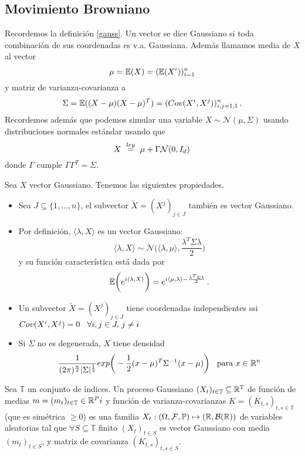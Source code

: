 % 

\subsection{Movimiento Browniano}
Recordemos la definición \ref{gauss}. Un vector se dice Gaussiano si toda combinación de sus coordenadas es v.a. Gaussiana. Además llamamos media de $X$ al vector
$$ \mu = \mathbb{E}(X) = (\mathbb{E}(X^i))^n_{i=1}$$
y matriz de varianza-covarianza a 
$$ \Sigma = \mathbb{E}((X-\mu)(X-\mu)^T)=(Cov(X^i,X^j))^n_{i,j=1,1} \,.$$
Recordemos además que podemos simular una variable $X\sim\mathcal{N}(\mu,\Sigma)$ usando distribuciones normales estándar usando que
$$ X\mbox{ }\overset{ley}{=}\mbox{ } \mu + \Gamma \mathcal{N}(0,I_d) \, $$
donde $\Gamma$ cumple $\Gamma \Gamma^T=\Sigma$. %

\begin{proposition}
Sea $X$ vector Gaussiano. Tenemos las siguientes propiedades.
\begin{itemize}
    \item Sea $J\subseteq \{1,\dots,n\}$, el subvector $\tilde X = (X^j)_{j\in J}$ también es vector Gaussiano.
    \item Por definición, $\langle \lambda,X\rangle $ es un vector Gaussiano:
    $$ \langle \lambda,X\rangle \sim \mathcal{N}\bigg(\langle \lambda,\mu\rangle,\frac{\lambda^T\Sigma\lambda}{2}\bigg) $$
    y su función característica está dada por
    $$ \mathbb{E}\bigg(e^{i\langle \lambda,X\rangle}\bigg) = \displaystyle e^{i\langle \mu,\lambda\rangle-\frac{\lambda^T\Sigma\lambda}{2}} \,.$$
    \item Un subvector $\tilde X=(X^j)_{j\in J}$ tiene coordenadas independientes ssi $Cov(X^i,X^j)=0 \hspace{.25cm}\, \forall i,j\in J,\,j\neq i$
    \item Si $\Sigma$ no es degenerada, $X$ tiene densidad
    $$ \displaystyle \frac{1}{(2\pi)^{\frac{n}{2}}|\Sigma|^{\frac{1}{2}}} exp\bigg(-\frac{1}{2}(x-\mu)^T\Sigma^{-1}(x-\mu)\bigg) \hspace{.25cm}\,\text{para }x\in\mathbb{R}^n $$
\end{itemize}
\end{proposition}

\begin{definition}
\label{def:pro_gauss}
Sea $\mathbb{T}$ un conjunto de índices. Un proceso Gaussiano $(X_t)_{t\in\mathbb{T}}\subseteq \mathbb{R}^{\mathbb{T}}$ de función de medias $m=(m_t)_{t\in\mathbb{T}}\in\mathbb{R}^Pi$ y función de varianza-covarianzas $K=(K_{t,s})_{t,s\in\mathbb{T}}$ (que es simétrica $\geq 0$) es una familia $X_t:(\Omega,\mathcal{F},\mathbb{P})\mapsto (\mathbb{R},\mathcal{B}(\mathbb{R}))$ de variables aleatorias tal que $\forall S\subseteq \mathbb{T}$ finito $(X_t)_{t\in S}$ es vector Gaussiano con media $(m_t)_{t\in S}$, y matriz de covarianza $(K_{t,s})_{t,s\in S}$.
\end{definition}

